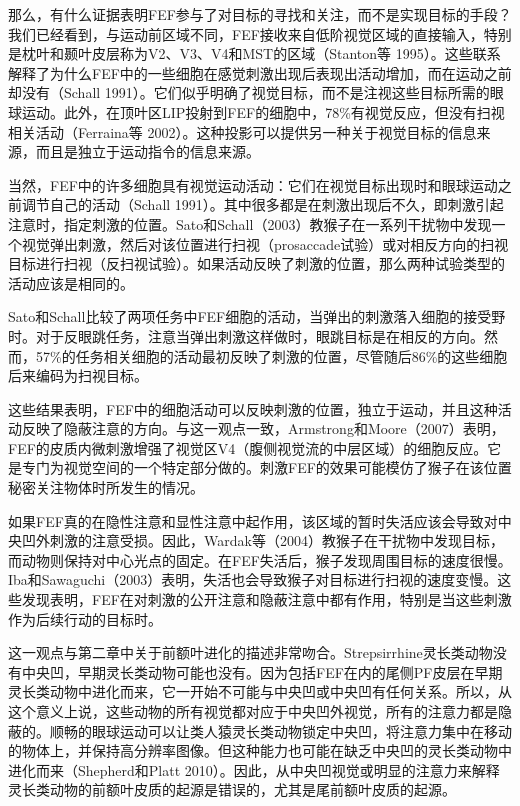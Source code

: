那么，有什么证据表明FEF参与了对目标的寻找和关注，而不是实现目标的手段？我们已经看到，与运动前区域不同，FEF接收来自低阶视觉区域的直接输入，特别是枕叶和颞叶皮层称为V2、V3、V4和MST的区域（Stanton等 1995）。这些联系解释了为什么FEF中的一些细胞在感觉刺激出现后表现出活动增加，而在运动之前却没有（Schall 1991）。它们似乎明确了视觉目标，而不是注视这些目标所需的眼球运动。此外，在顶叶区LIP投射到FEF的细胞中，78\%有视觉反应，但没有扫视相关活动（Ferraina等 2002）。这种投影可以提供另一种关于视觉目标的信息来源，而且是独立于运动指令的信息来源。

当然，FEF中的许多细胞具有视觉运动活动：它们在视觉目标出现时和眼球运动之前调节自己的活动（Schall 1991）。其中很多都是在刺激出现后不久，即刺激引起注意时，指定刺激的位置。Sato和Schall（2003）教猴子在一系列干扰物中发现一个视觉弹出刺激，然后对该位置进行扫视（prosaccade试验）或对相反方向的扫视目标进行扫视（反扫视试验）。如果活动反映了刺激的位置，那么两种试验类型的活动应该是相同的。

Sato和Schall比较了两项任务中FEF细胞的活动，当弹出的刺激落入细胞的接受野时。对于反眼跳任务，注意当弹出刺激这样做时，眼跳目标是在相反的方向。然而，57\%的任务相关细胞的活动最初反映了刺激的位置，尽管随后86\%的这些细胞后来编码为扫视目标。

这些结果表明，FEF中的细胞活动可以反映刺激的位置，独立于运动，并且这种活动反映了隐蔽注意的方向。与这一观点一致，Armstrong和Moore（2007）表明，FEF的皮质内微刺激增强了视觉区V4（腹侧视觉流的中层区域）的细胞反应。它是专门为视觉空间的一个特定部分做的。刺激FEF的效果可能模仿了猴子在该位置秘密关注物体时所发生的情况。

如果FEF真的在隐性注意和显性注意中起作用，该区域的暂时失活应该会导致对中央凹外刺激的注意受损。因此，Wardak等（2004）教猴子在干扰物中发现目标，而动物则保持对中心光点的固定。在FEF失活后，猴子发现周围目标的速度很慢。Iba和Sawaguchi（2003）表明，失活也会导致猴子对目标进行扫视的速度变慢。这些发现表明，FEF在对刺激的公开注意和隐蔽注意中都有作用，特别是当这些刺激作为后续行动的目标时。

这一观点与第二章中关于前额叶进化的描述非常吻合。Strepsirrhine灵长类动物没有中央凹，早期灵长类动物可能也没有。因为包括FEF在内的尾侧PF皮层在早期灵长类动物中进化而来，它一开始不可能与中央凹或中央凹有任何关系。所以，从这个意义上说，这些动物的所有视觉都对应于中央凹外视觉，所有的注意力都是隐蔽的。顺畅的眼球运动可以让类人猿灵长类动物锁定中央凹，将注意力集中在移动的物体上，并保持高分辨率图像。但这种能力也可能在缺乏中央凹的灵长类动物中进化而来（Shepherd和Platt 2010）。因此，从中央凹视觉或明显的注意力来解释灵长类动物的前额叶皮质的起源是错误的，尤其是尾前额叶皮质的起源。

